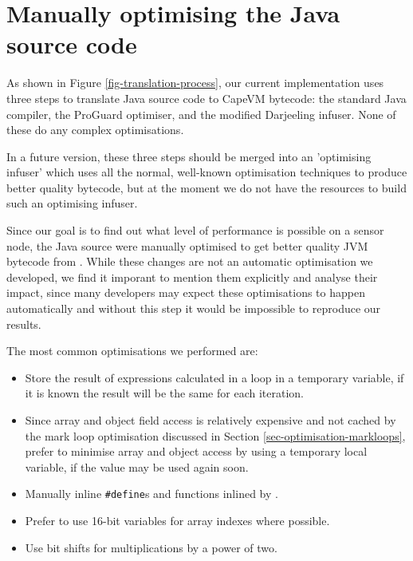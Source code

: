 \section{Manually optimising the Java source code}
\label{sec-optimisations-manual-java-source-optimisation}
As shown in Figure \ref{fig-translation-process}, our current implementation uses three steps to translate Java source code to CapeVM bytecode: the standard Java compiler, the ProGuard optimiser, and the modified Darjeeling infuser. None of these do any complex optimisations. 

In a future version, these three steps should be merged into an 'optimising infuser' which uses all the normal, well-known optimisation techniques to produce better quality bytecode, but at the moment we do not have the resources to build such an optimising infuser.

Since our goal is to find out what level of performance is possible on a sensor node, the Java source were manually optimised to get better quality JVM bytecode from . While these changes are not an automatic optimisation we developed, we find it imporant to mention them explicitly and analyse their impact, since many developers may expect these optimisations to happen automatically and without this step it would be impossible to reproduce our results.


The most common optimisations we performed are:
\begin{itemize}
	\item Store the result of expressions calculated in a loop in a temporary variable, if it is known the result will be the same for each iteration.
	\item Since array and object field access is relatively expensive and not cached by the mark loop optimisation discussed in Section \ref{sec-optimisation-markloops}, prefer to minimise array and object access by using a temporary local variable, if the value may be used again soon.
	\item Manually inline \texttt{\#define}s and functions inlined by .
	\item Prefer to use 16-bit variables for array indexes where possible.
	\item Use bit shifts for multiplications by a power of two.
\end{itemize}

